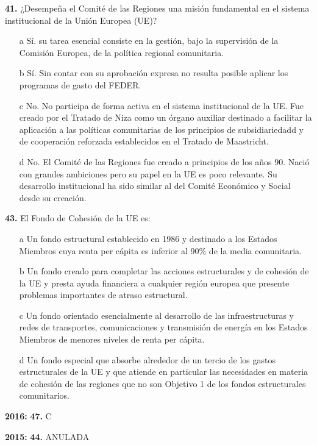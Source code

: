 \documentclass{nuevotema}
\begin{document}
\textbf{41.} ¿Desempeña el Comité de las Regiones una misión fundamental en el sistema institucional de la Unión Europea (UE)?
\begin{itemize}
	\item[a] Sí. su tarea esencial consiste en la gestión, bajo la supervisión de la Comisión Europea, de la política regional comunitaria.
	\item[b] Sí. Sin contar con su aprobación expresa no resulta posible aplicar los programas de gasto del FEDER.
	\item[c] No. No participa de forma activa en el sistema institucional de la UE. Fue creado por el Tratado de Niza como un órgano auxiliar destinado a facilitar la aplicación a las políticas comunitarias de los principios de subsidiariedadd y de cooperación reforzada establecidos en el Tratado de Maastricht.
	\item[d] No. El Comité de las Regiones fue creado a principios de los años 90. Nació con grandes ambiciones pero su papel en la UE es poco relevante. Su desarrollo institucional ha sido similar al del Comité Económico y Social desde su creación.
\end{itemize}

\textbf{43.} El Fondo de Cohesión de la UE es:
\begin{itemize}
	\item[a] Un fondo estructural establecido en 1986 y destinado a los Estados Miembros cuya renta per cápita es inferior al 90\% de la media comunitaria.
	\item[b] Un fondo creado para completar las acciones estructurales y de cohesión de la UE y presta ayuda financiera a cualquier región europea que presente problemas importantes de atraso estructural.
	\item[c] Un fondo orientado esencialmente al desarrollo de las infraestructuras y redes de transportes, comunicaciones y transmisión de energía en los Estados Miembros de menores niveles de renta per cápita. 
	\item[d] Un fondo especial que absorbe alrededor de un tercio de los gastos estructurales de la UE y que atiende en particular las necesidades en materia de cohesión de las regiones que no son Objetivo 1 de los fondos estructurales comunitarios.
\end{itemize}

\notas

\textbf{2016:} \textbf{47.} C

\textbf{2015:} \textbf{44.} ANULADA
\end{document}

